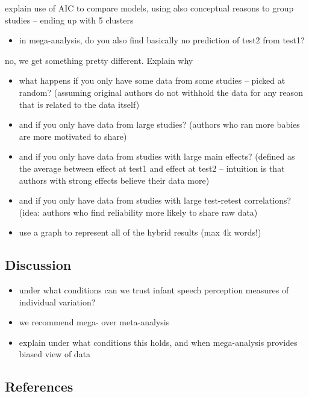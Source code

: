 \documentclass[man]{apa6}
\providecommand{\tightlist}{%
  \setlength{\itemsep}{0pt}\setlength{\parskip}{0pt}}
\begin{document}
explain use of AIC to compare models, using also conceptual reasons to
group studies -- ending up with 5 clusters

\begin{itemize}
\tightlist
\item
  in mega-analysis, do you also find basically no prediction of test2
  from test1?
\end{itemize}

no, we get something pretty different. Explain why

\begin{itemize}
\item
  what happens if you only have some data from some studies -- picked at
  random? (assuming original authors do not withhold the data for any
  reason that is related to the data itself)
\item
  and if you only have data from large studies? (authors who ran more
  babies are more motivated to share)
\item
  and if you only have data from studies with large main effects?
  (defined as the average between effect at test1 and effect at test2 --
  intuition is that authors with strong effects believe their data more)
\item
  and if you only have data from studies with large test-retest
  correlations? (idea: authors who find reliability more likely to share
  raw data)
\item
  use a graph to represent all of the hybrid results (max 4k words!)
\end{itemize}

\subsection{Discussion}\label{discussion}

\begin{itemize}
\tightlist
\item
  under what conditions can we trust infant speech perception measures
  of individual variation?
\item
  we recommend mega- over meta-analysis
\item
  explain under what conditions this holds, and when mega-analysis
  provides biased view of data
\end{itemize}

\subsection{References}\label{references}
\end{document}

